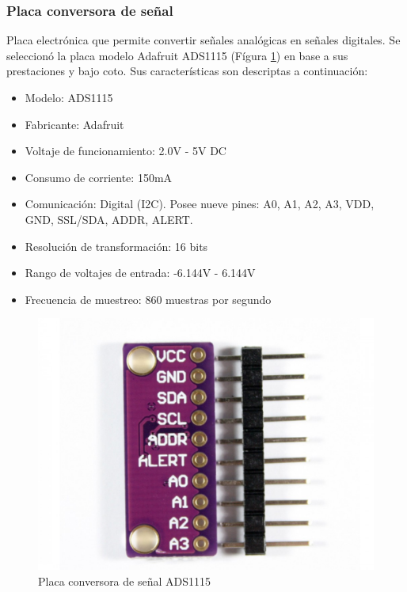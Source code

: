         \subsubsection{Placa conversora de señal}
        
        \par Placa electrónica que permite convertir señales analógicas en señales digitales. Se seleccionó la placa modelo Adafruit ADS1115 (Fígura \ref{ADS1115}) en base a sus prestaciones y bajo coto.
        Sus características son descriptas a continuación:
        \begin{itemize}
                    \item Modelo: ADS1115
                    \item Fabricante: Adafruit
                    \item Voltaje de funcionamiento: 2.0V - 5V DC
                    \item Consumo de corriente: 150mA
                    \item Comunicación: Digital (I2C). Posee nueve pines: A0, A1, A2, A3, VDD, GND, SSL/SDA, ADDR, ALERT.
                    \item Resolución de transformación: 16 bits
                    \item Rango de voltajes de entrada: -6.144V - 6.144V
                    \item Frecuencia de muestreo: 860 muestras por segundo 
        \end{itemize}
        
        \begin{figure} [h]
            \centering            \includegraphics[scale=0.2]{hardware/ADS1115.jpg}
            \caption{Placa conversora de señal ADS1115}
            \label{ADS1115}
        \end{figure}
        
